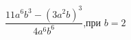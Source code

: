 \begin{ex}[type=simplify_calculate]
	\begin{condition}
		\( \dfrac{11a^6b^3-(3a^2b)^3}{4a^6b^6} \),\quad при \( b=2 \)
	\end{condition}
\end{ex}